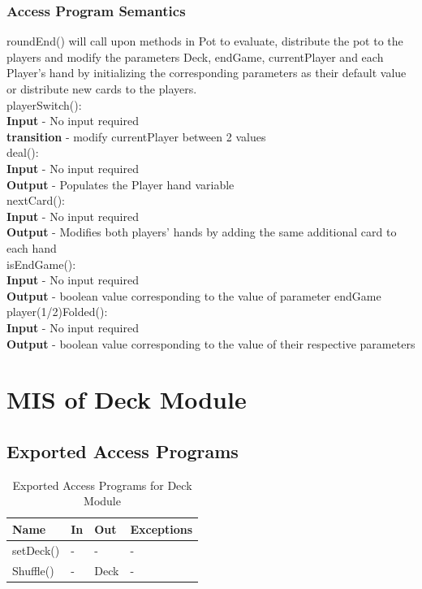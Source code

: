 \documentclass[11pt]{article}
\begin{document}
    \subsubsection{Access Program Semantics}
 	roundEnd() will call upon methods in Pot to evaluate, distribute the pot to the players and modify the parameters Deck, endGame, currentPlayer and each Player's hand by initializing the corresponding parameters as their default value or distribute new cards to the players.\\
 	playerSwitch():\\
 	\textbf{Input} - No input required\\
 	\textbf{transition} - modify currentPlayer between 2 values\\
 	deal():\\
 	\textbf{Input} - No input required\\
 	\textbf{Output} - Populates the Player hand variable\\
 	nextCard():\\
 	\textbf{Input} - No input required\\
 	\textbf{Output} - Modifies both players' hands by adding the same additional card to each hand\\
 	isEndGame():\\
 	\textbf{Input} - No input required\\
 	\textbf{Output} - boolean value corresponding to the value of parameter endGame\\
 	player(1/2)Folded():\\
 	\textbf{Input} - No input required\\
 	\textbf{Output} - boolean value corresponding to the value of their respective parameters
 	\newline 
 	
 	\section{MIS of Deck Module}
     
    \subsection{Exported Access Programs}
    \begin{table}[h]
    \caption{Exported Access Programs for Deck Module}
    \begin{tabular}{p{4cm}p{2cm}p{2cm}p{4cm}}
    Name & In & Out & Exceptions\\
    \hline
    setDeck() & - & - & - \\
    \hline
    Shuffle() & - & Deck & -\\
    \hline
    \end{tabular}
    \end{table}
\end{document}
